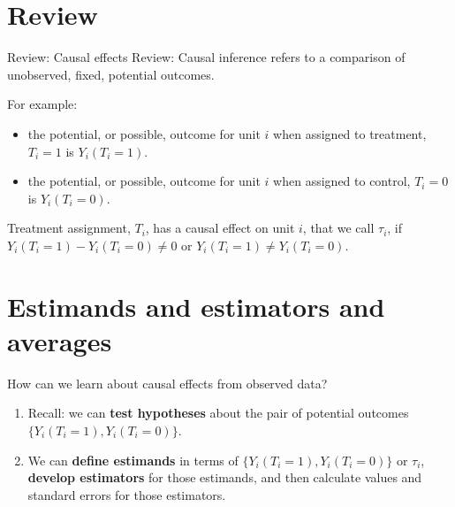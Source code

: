 \documentclass[
  ignorenonframetext,
]{beamer}
\providecommand{\tightlist}{%
  \setlength{\itemsep}{0pt}\setlength{\parskip}{0pt}}
\begin{document}
\hypertarget{review}{%
\section{Review}\label{review}}

\begin{frame}{Review: Causal effects}
\protect\hypertarget{review-causal-effects}{}
Review: Causal inference refers to a comparison of unobserved, fixed,
potential outcomes.

For example:

\begin{itemize}
\tightlist
\item
  the potential, or possible, outcome for unit \(i\) when assigned to
  treatment, \(T_i=1\) is \(Y_{i}(T_{i}=1)\).
\item
  the potential, or possible, outcome for unit \(i\) when assigned to
  control, \(T_i=0\) is \(Y_{i}(T_{i}=0)\).
\end{itemize}

Treatment assignment, \(T_i\), has a causal effect on unit \(i\), that
we call \(\tau_i\), if \(Y_{i}(T_{i}=1) - Y_{i}(T_{i}=0) \ne 0\) or
\(Y_{i}(T_{i}=1) \ne Y_{i}(T_{i}=0)\).
\end{frame}

\hypertarget{estimands-and-estimators-and-averages}{%
\section{Estimands and estimators and
averages}\label{estimands-and-estimators-and-averages}}

\begin{frame}{How can we learn about causal effects from observed data?}
\protect\hypertarget{how-can-we-learn-about-causal-effects-from-observed-data}{}
\begin{enumerate}
\item
  Recall: we can \textbf{test hypotheses} about the pair of potential
  outcomes \(\{ Y_{i}(T_{i}=1), Y_{i}(T_{i}=0) \}\).
\item
  We can \textbf{define estimands} in terms of
  \(\{ Y_{i}(T_{i}=1), Y_{i}(T_{i}=0) \}\) or \(\tau_i\),
  \textbf{develop estimators} for those estimands, and then calculate
  values and standard errors for those estimators.
\end{enumerate}
\end{frame}
\end{document}
